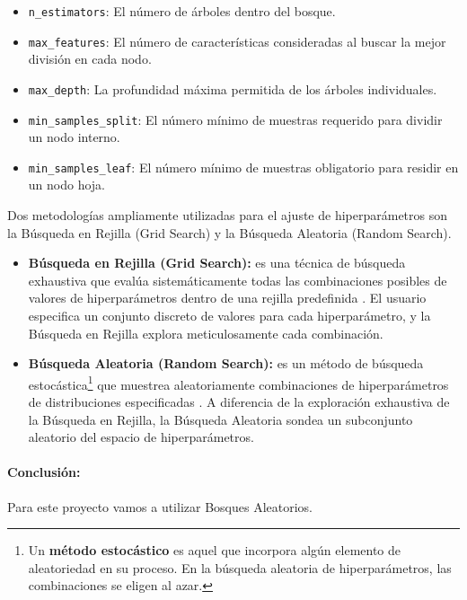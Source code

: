 \begin{itemize}
    \item \texttt{n\_estimators}: El número de árboles dentro del bosque.
    \item \texttt{max\_features}: El número de características consideradas al buscar la mejor división en cada nodo.
    \item \texttt{max\_depth}: La profundidad máxima permitida de los árboles individuales.
    \item \texttt{min\_samples\_split}: El número mínimo de muestras requerido para dividir un nodo interno.
    \item \texttt{min\_samples\_leaf}: El número mínimo de muestras obligatorio para residir en un nodo hoja.
\end{itemize}

Dos metodologías ampliamente utilizadas para el ajuste de hiperparámetros son la Búsqueda en Rejilla (Grid Search) y la Búsqueda Aleatoria (Random Search).

\begin{itemize}
	\item \textbf{Búsqueda en Rejilla (Grid Search):} es una técnica de búsqueda exhaustiva que evalúa sistemáticamente todas las combinaciones posibles de valores de hiperparámetros dentro de una rejilla predefinida \cite{bergstra2012random}.
	El usuario especifica un conjunto discreto de valores para cada hiperparámetro, y la Búsqueda en Rejilla explora meticulosamente cada combinación.

	\item \textbf{Búsqueda Aleatoria (Random Search):} es un método de búsqueda estocástica\footnote{Un \textbf{método estocástico} es aquel que incorpora algún elemento de aleatoriedad en su proceso.
	En la búsqueda aleatoria de hiperparámetros, las combinaciones se eligen al azar.} que muestrea aleatoriamente combinaciones de hiperparámetros de distribuciones especificadas \cite{bergstra2012random}.
	A diferencia de la exploración exhaustiva de la Búsqueda en Rejilla, la Búsqueda Aleatoria sondea un subconjunto aleatorio del espacio de hiperparámetros.
\end{itemize}

\paragraph{Conclusión:}
Para este proyecto vamos a utilizar Bosques Aleatorios.
